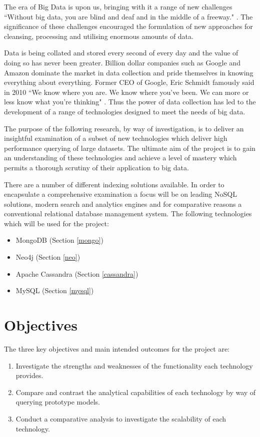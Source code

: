 The era of Big Data is upon us, bringing with it a range of new challenges ``Without big data, you are blind and deaf and in the middle of a freeway."\cite{moore} . The significance of these challenges encouraged the formulation of new approaches for cleansing, processing and utilising enormous amounts of data.

Data is being collated and stored every second of every day and the value of doing so has never been greater. Billion dollar companies such as Google and Amazon dominate the market in data collection and pride themselves in knowing everything about everything. Former CEO of Google, Eric Schmidt famously said in 2010 ``We know where you are. We know where you've been. We can more or less know what you're thinking" \cite{schmidt}. Thus the power of data collection has led to the development of a range of technologies designed to meet the needs of big data.

The purpose of the following research, by way of investigation, is to deliver an insightful examination of a subset of new technologies which deliver high performance querying of large datasets. The ultimate aim of the project is to gain an understanding of these technologies and achieve a level of mastery which permits a thorough scrutiny of their application to big data.

There are a number of different indexing solutions available. In order to encapsulate a comprehensive examination a focus will be on leading NoSQL solutions, modern search and analytics engines and for comparative reasons a conventional relational database management system. The following technologies which will be used for the project: 

\begin{itemize}
\item MongoDB (Section \ref{mongo})
\item Neo4j (Section \ref{neo})
\item Apache Cassandra (Section \ref{cassandra})
\item MySQL (Section \ref{mysql})
\end{itemize}

\section{Objectives}\label{objectives}
The three key objectives and main intended outcomes for the project are:
\begin{enumerate}
\item Investigate the strengths and weaknesses of the functionality each technology provides.
\item Compare and contrast the analytical capabilities of each technology by way of querying prototype models.
\item Conduct a comparative analysis to investigate the scalability of each technology.
\end{enumerate}


